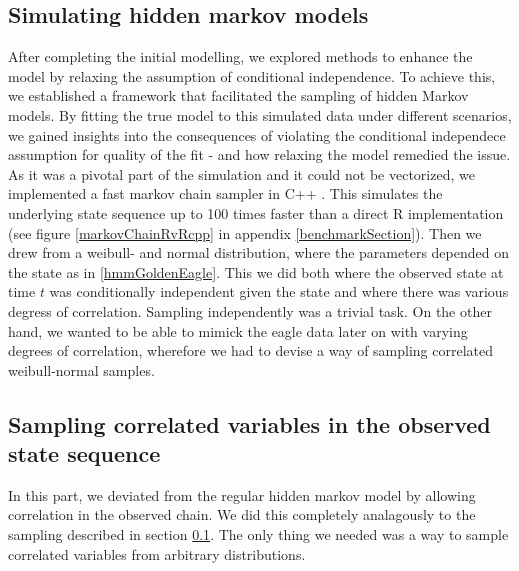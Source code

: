 \subsection{Simulating hidden markov models}\label{simHMM}
After completing the initial modelling, we explored methods to enhance the model by relaxing the assumption of conditional independence. To achieve this, we established a framework that facilitated the sampling of hidden Markov models. By fitting the true model to this simulated data under different scenarios, we gained insights into the consequences of violating the conditional independece assumption for quality of the fit - and how relaxing the model remedied the issue.\\
As it was a pivotal part of the simulation and it could not be vectorized, we implemented a fast markov chain sampler in C++ \cite{Rcpp}. This simulates the underlying state sequence up to 100 times faster than a direct R implementation (see figure \ref{markovChainRvRcpp} in appendix \ref{benchmarkSection}). Then we drew from a weibull- and normal distribution, where the parameters depended on the state as in \ref{hmmGoldenEagle}. This we did both where the observed state at time $t$ was conditionally independent given the state and where there was various degress of correlation. Sampling independently was a trivial task. On the other hand, we wanted to be able to mimick the eagle data later on with varying degrees of correlation, wherefore we had to devise a way of sampling correlated weibull-normal samples. 
\subsection{Sampling correlated variables in the observed state sequence}\label{correlatedVariables}
In this part, we deviated from the regular hidden markov model by allowing correlation in the observed chain. We did this completely analagously to the sampling described in section \ref{simHMM}. The only thing we needed was a way to sample correlated variables from arbitrary distributions.
